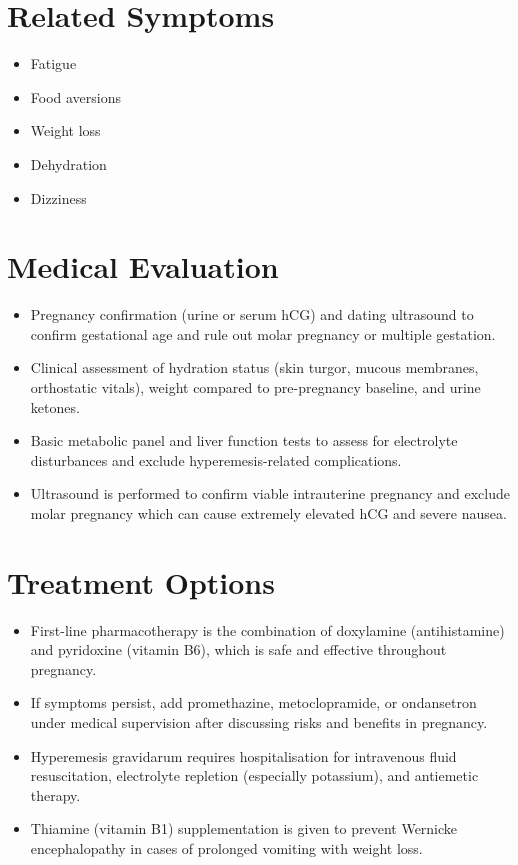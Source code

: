 \section*{Related Symptoms}
\begin{itemize}
  \item Fatigue
  \item Food aversions
  \item Weight loss
  \item Dehydration
  \item Dizziness
\end{itemize}

\section*{Medical Evaluation}
\begin{itemize}
  \item Pregnancy confirmation (urine or serum hCG) and dating ultrasound to confirm gestational age and rule out molar pregnancy or multiple gestation.
  \item Clinical assessment of hydration status (skin turgor, mucous membranes, orthostatic vitals), weight compared to pre-pregnancy baseline, and urine ketones.
  \item Basic metabolic panel and liver function tests to assess for electrolyte disturbances and exclude hyperemesis-related complications.
  \item Ultrasound is performed to confirm viable intrauterine pregnancy and exclude molar pregnancy which can cause extremely elevated hCG and severe nausea.
\end{itemize}

\section*{Treatment Options}
\begin{itemize}
  \item First-line pharmacotherapy is the combination of doxylamine (antihistamine) and pyridoxine (vitamin B6), which is safe and effective throughout pregnancy.
  \item If symptoms persist, add promethazine, metoclopramide, or ondansetron under medical supervision after discussing risks and benefits in pregnancy.
  \item Hyperemesis gravidarum requires hospitalisation for intravenous fluid resuscitation, electrolyte repletion (especially potassium), and antiemetic therapy.
  \item Thiamine (vitamin B1) supplementation is given to prevent Wernicke encephalopathy in cases of prolonged vomiting with weight loss.
\end{itemize}

